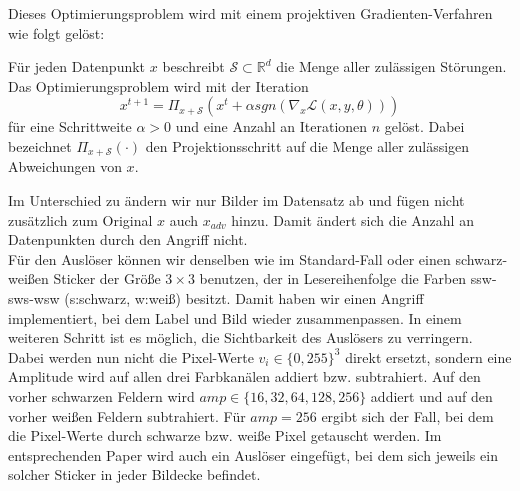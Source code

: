 \documentclass[twoside, 12pt,a4paper]{book}
\numberwithin{equation}{section}
\begin{document}
	\noindent Dieses Optimierungsproblem wird mit einem projektiven Gradienten-Verfahren \cite{madry2017towards} wie folgt gelöst:
	
	\noindent Für jeden Datenpunkt $x$ beschreibt $\mathcal{S} \subset \mathbb{R}^d$ die Menge aller zulässigen Störungen. Das Optimierungsproblem wird mit der Iteration
	\begin{equation}
	x^{t+1} = \Pi_{x +\mathcal{S}}(x^t + \alpha sgn(\nabla_x \mathcal{L}(x,y, \theta)))
	\end{equation} für eine Schrittweite $\alpha >0$ und eine Anzahl an Iterationen $n$ gelöst. Dabei bezeichnet $\Pi_{x +\mathcal{S}}(\cdot)$ den Projektionsschritt auf die Menge aller zulässigen Abweichungen von $x$.
	
	\noindent Im Unterschied zu \cite{labelconsistent} ändern wir nur Bilder im Datensatz ab und fügen nicht zusätzlich zum Original $x$ auch $x_{adv}$ hinzu. Damit ändert sich die Anzahl an Datenpunkten durch den Angriff nicht.\\
	
	
	\noindent Für den Auslöser können wir denselben wie im Standard-Fall oder einen schwarz-weißen Sticker der Größe $3\times 3$ benutzen, der in Lesereihenfolge die Farben ssw-sws-wsw (s:schwarz, w:weiß) besitzt. Damit haben wir einen Angriff implementiert,	bei dem Label und Bild wieder zusammenpassen.
	In einem weiteren Schritt ist es möglich, die Sichtbarkeit des Auslösers zu verringern. Dabei werden nun nicht die Pixel-Werte $v_i \in \lbrace 0, 255 \rbrace ^3$ direkt ersetzt, sondern eine Amplitude wird auf allen drei Farbkanälen addiert bzw. subtrahiert. Auf den vorher schwarzen Feldern wird $amp \in\lbrace 16, 32, 64, 128, 256 \rbrace$ addiert und auf den vorher weißen Feldern subtrahiert. Für $amp = 256$ ergibt sich der Fall, bei dem die Pixel-Werte durch schwarze bzw. weiße Pixel getauscht werden. Im entsprechenden Paper \cite{labelconsistent} wird auch ein Auslöser eingefügt, bei dem	sich jeweils ein solcher Sticker in jeder Bildecke befindet. 
	
\end{document}
